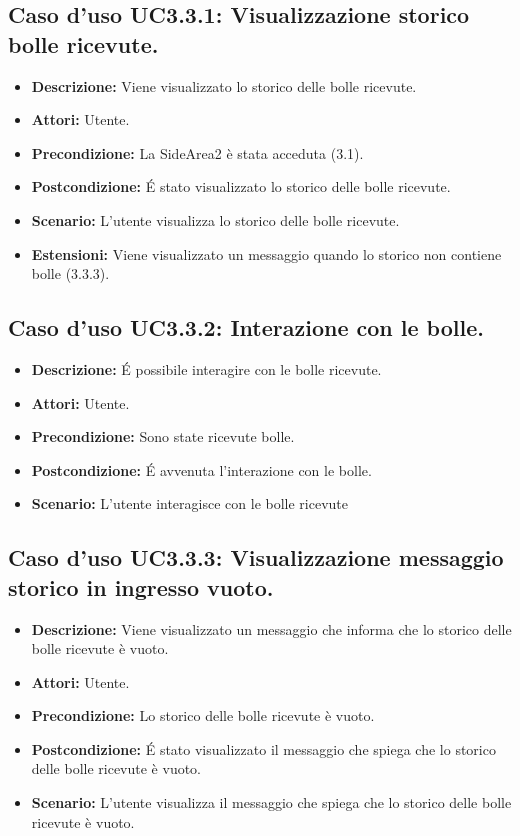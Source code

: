 \subsection{Caso d'uso UC3.3.1: Visualizzazione storico bolle ricevute.}
\begin{itemize}
\item[]\textbf{Descrizione:} Viene visualizzato lo storico delle bolle ricevute.
\item[]\textbf{Attori:} Utente. 
\item[]\textbf{Precondizione:} La SideArea2 è stata acceduta (3.1). 
\item[]\textbf{Postcondizione:} \'E stato visualizzato lo storico delle bolle ricevute. 
\item[]\textbf{Scenario:}
L'utente visualizza lo storico delle bolle ricevute. 
\item[]\textbf{Estensioni:}
Viene visualizzato un messaggio quando lo storico non contiene bolle (3.3.3). 
\end{itemize}

\subsection{Caso d'uso UC3.3.2: Interazione con le bolle.}
\begin{itemize}
\item[]\textbf{Descrizione:} \'E possibile interagire con le bolle ricevute.
\item[]\textbf{Attori:} Utente. 
\item[]\textbf{Precondizione:} Sono state ricevute bolle. 
\item[]\textbf{Postcondizione:} \'E avvenuta l'interazione con le bolle. 
\item[]\textbf{Scenario:}
L'utente interagisce con le bolle ricevute 
\end{itemize}

\subsection{Caso d'uso UC3.3.3: Visualizzazione messaggio storico in ingresso vuoto.}
\begin{itemize}
\item[]\textbf{Descrizione:} Viene visualizzato un messaggio che informa che lo storico delle bolle ricevute è vuoto.
\item[]\textbf{Attori:} Utente. 
\item[]\textbf{Precondizione:} Lo storico delle bolle ricevute è vuoto. 
\item[]\textbf{Postcondizione:} \'E stato visualizzato il messaggio che spiega che lo storico delle bolle ricevute è vuoto. 
\item[]\textbf{Scenario:}
L'utente visualizza il messaggio che spiega che lo storico delle bolle ricevute è vuoto. 
\end{itemize}

